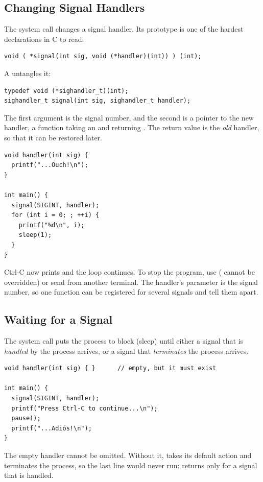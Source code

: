 \subsection{Changing Signal Handlers}

The  system call changes a signal handler. Its prototype is one of the hardest declarations in C to read:
\begin{lstlisting}
void ( *signal(int sig, void (*handler)(int)) ) (int);
\end{lstlisting}
A  untangles it:
\begin{lstlisting}
typedef void (*sighandler_t)(int);
sighandler_t signal(int sig, sighandler_t handler);
\end{lstlisting}
The first argument is the signal number, and the second is a pointer to the new handler, a function taking an  and returning . The return value is the \emph{old} handler, so that it can be restored later.

\begin{example}
\begin{lstlisting}
void handler(int sig) {
  printf("...Ouch!\n");
}

int main() {
  signal(SIGINT, handler);
  for (int i = 0; ; ++i) {
    printf("%d\n", i);
    sleep(1);
  }
}
\end{lstlisting}
  Ctrl-C now prints  and the loop continues. To stop the program, use  ( cannot be overridden) or send  from another terminal. The handler's parameter  is the signal number, so one function can be registered for several signals and tell them apart.
\end{example}

\subsection{Waiting for a Signal}

The  system call puts the process to block (sleep) until either a signal that is \emph{handled} by the process arrives, or a signal that \emph{terminates} the process arrives.

\begin{example}
\begin{lstlisting}
void handler(int sig) { }      // empty, but it must exist

int main() {
  signal(SIGINT, handler);
  printf("Press Ctrl-C to continue...\n");
  pause();
  printf("...Adiós!\n");
}
\end{lstlisting}
  The empty handler cannot be omitted. Without it,  takes its default action and terminates the process, so the last line would never run:  returns only for a signal that is handled.
\end{example}

